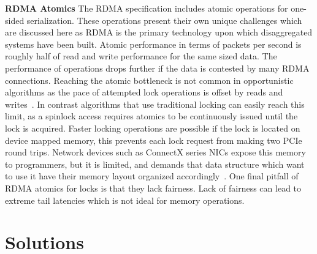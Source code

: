 
\textbf{RDMA Atomics}
The RDMA specification includes atomic operations for one-sided serialization.
These operations present their own unique challenges which are discussed here as
RDMA is the primary technology upon which disaggregated systems have been built.
Atomic performance in terms of packets per second is roughly half of read and
write performance for the same sized data. The performance of operations drops
further if the data is contested by many RDMA connections. Reaching the atomic
bottleneck is not common in opportunistic algorithms as the pace of attempted
lock operations is offset by reads and writes~\cite{clover}. In contrast
algorithms that use traditional locking can easily reach this limit, as a
spinlock access requires atomics to be continuously issued until the lock is
acquired. Faster locking operations are possible if the lock is located on
device mapped memory, this prevents each lock request from making two PCIe round
trips. Network devices such as ConnectX series NICs expose this memory to
programmers, but it is limited, and demands that data structure which want to
use it have their memory layout organized accordingly~\cite{sherman}. One final
pitfall of RDMA atomics for locks is that they lack fairness. Lack of fairness can lead to
extreme tail latencies which is not ideal for memory operations.

\section{Solutions}
\label{sec:solutions}


